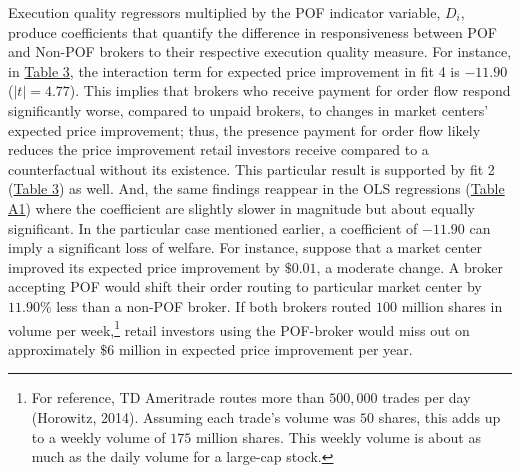 \documentclass[12pt,a4paper]{extarticle}
\begin{document}
Execution quality regressors multiplied by the POF indicator variable, $D_i$, produce coefficients that quantify the difference in responsiveness between POF and Non-POF brokers to their respective execution quality measure. For instance, in \hyperref[table:3]{Table 3}, the interaction term for expected price improvement in fit 4 is $-11.90$ ($|t| = 4.77$). This implies that brokers who receive payment for order flow respond significantly worse, compared to unpaid brokers, to changes in market centers' expected price improvement; thus, the presence payment for order flow likely reduces the price improvement retail investors receive compared to a counterfactual without its existence. This particular result is supported by fit 2 (\hyperref[table:3]{Table 3}) as well. And, the same findings reappear in the OLS regressions (\hyperref[table:a1]{Table A1}) where the coefficient are slightly slower in magnitude but about equally significant. In the particular case mentioned earlier, a coefficient of $-11.90$ can imply a significant loss of welfare. For instance, suppose that a market center improved its expected price improvement by $\$0.01$, a moderate change. A broker accepting POF would shift their order routing to particular market center by $11.90\%$ less than a non-POF broker. If both brokers routed $100$ million shares in volume per week,\footnote{ For reference, TD Ameritrade routes more than $500{,}000$ trades per day (Horowitz, 2014). Assuming each trade's volume was $50$ shares, this adds up to a weekly volume of $175$ million shares. This weekly volume is about as much as the daily volume for a large-cap stock.}  retail investors using the POF-broker would miss out on approximately $\$6$ million in expected price improvement per year. 
\end{document}
